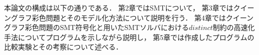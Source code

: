 %
%
%
%
%


本論文の構成は以下の通りである．
第2章ではSMTについて，
第3章ではクイーングラフ彩色問題とそのモデル化方法について説明を行う．
第4章ではクイーングラフ彩色問題のSMT符号化と用いたSMTソルバにおける$distinct$制約の高速化手法についてプログラムを示しながら説明し，
第5章では作成したプログラムの比較実験とその考察について述べる．

